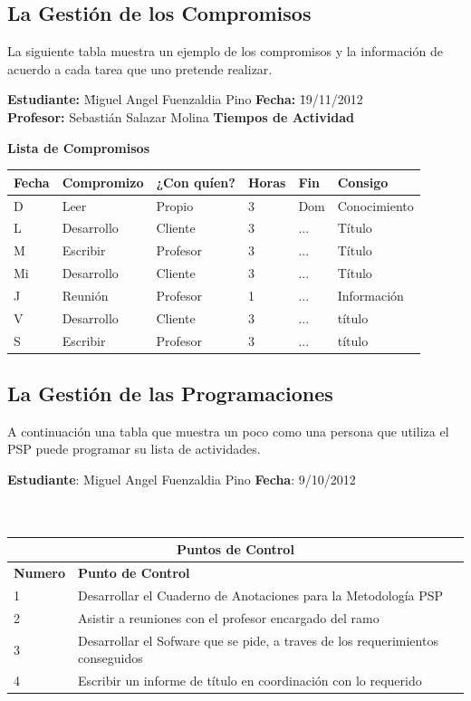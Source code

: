 \documentclass[a4paper,12pt,openany,oneside]{book}
\begin{document}
\subsection{La Gestión de los Compromisos}
La siguiente tabla muestra un ejemplo de los compromisos y la información de acuerdo a cada tarea que uno pretende realizar.

\begin{tabbing}
\textbf{Estudiante:} \= Miguel Angel Fuenzaldia Pino \= \textbf{Fecha:} \= 19/11/2012\\
\textbf{Profesor:} \> Sebastián Salazar Molina \> \textbf{Tiempos de Actividad} \>  \\
\end{tabbing}
\textbf{Lista de Compromisos}\\
\begin{tabular}{| l | l | l | l | l | l |}
\hline
\textbf{Fecha} & \textbf{Compromizo} & \textbf{¿Con quíen?} & \textbf{Horas} & \textbf{Fin} & \textbf{Consigo} \\
\hline
D  & Leer       & Propio   & 3 & Dom & Conocimiento \\
\hline
L  & Desarrollo & Cliente  & 3 & ... & Título \\
\hline
M  & Escribir   & Profesor & 3 & ... & Título \\
\hline
Mi & Desarrollo & Cliente  & 3 & ... & Título \\
\hline
J  & Reunión    & Profesor & 1 & ... & Información \\
\hline
V  & Desarrollo & Cliente  & 3 & ... & título \\
\hline
S  & Escribir   & Profesor & 3 & ... & título \\
\hline
\end{tabular}
\subsection{La Gestión de las Programaciones}
A continuación una tabla que muestra un poco como una persona que utiliza el PSP puede programar su lista de actividades.

\textbf{Estudiante}: Miguel Angel Fuenzaldia Pino     \textbf{Fecha}: 9/10/2012\\\\\
\begin{tabular}{| l | l |}
\hline
\multicolumn{2}{|c|}{\textbf{Puntos de Control}}\\
\hline
\textbf{Numero} & \textbf{Punto de Control}\\
\hline
1 & Desarrollar el Cuaderno de Anotaciones para la Metodología PSP \\
\hline
2 & Asistir a reuniones con el profesor encargado del ramo \\
\hline
3 & Desarrollar el Sofware que se pide, a traves de los requerimientos conseguidos \\
\hline
4 & Escribir un informe de título en coordinación con lo requerido\\
\hline
\end{tabular}
\end{document}

